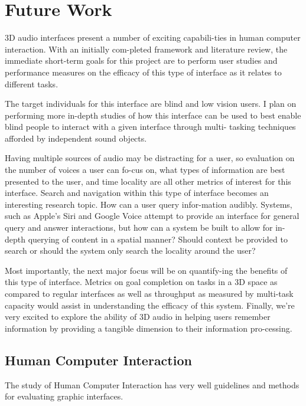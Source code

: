 \newpage                                                  \chapter{Future Work}

3D audio interfaces present a number of exciting capabili-ties in human computer
interaction. With an initially com-pleted framework and literature review, the
immediate short-term goals for this project are to perform user studies and
performance measures on the efficacy of this type of interface as it relates to
different tasks.

The target individuals for this interface are blind and low vision users.  I
plan on performing more in-depth studies of how this interface can be used to
best enable blind people to interact with a given interface through multi-
tasking techniques afforded by independent sound objects.

Having multiple sources of audio may be distracting for a user, so evaluation on
the number of voices a user can fo-cus on, what types of information are best
presented to the user, and time locality are all other metrics of interest for
this interface.   Search and navigation within this type of interface becomes an
interesting research topic.  How can a user query infor-mation audibly.
Systems, such as Apple’s Siri and Google Voice attempt to provide an interface
for general query and answer interactions, but how can a system be built to
allow for in-depth querying of content in a spatial manner?  Should context be
provided to search or should the system only search the locality around the
user?

Most importantly, the next major focus will be on quantify-ing the benefits of
this type of interface. Metrics on goal completion on tasks in a 3D space as
compared to regular interfaces as well as throughput as measured by multi-task
capacity would assist in understanding the efficacy of this system. Finally,
we’re very excited to explore the ability of 3D audio in helping users remember
information by providing a tangible dimension to their information pro-cessing.




\section{                  Human Computer Interaction                         }
The study of Human Computer Interaction has very well guidelines and methods
for evaluating graphic interfaces.


